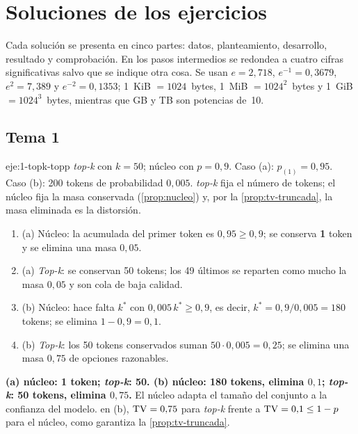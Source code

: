 \chapter{Soluciones de los ejercicios}
\label{ap:soluciones}

Cada solución se presenta en cinco partes: datos, planteamiento, desarrollo, resultado y comprobación. En los pasos intermedios se redondea a cuatro cifras significativas salvo que se indique otra cosa. Se usan $e=2{,}718$, $e^{-1}=0{,}3679$, $e^{2}=7{,}389$ y $e^{-2}=0{,}1353$; 1~KiB $=1024$~bytes, 1~MiB $=1024^{2}$~bytes y 1~GiB $=1024^{3}$~bytes, mientras que GB y TB son potencias de~10.

\section{Tema 1}

\begin{solucion}{eje:1-topk-topp}
\datos \emph{top-k} con $k=50$; núcleo con $p=0{,}9$. Caso (a): $p_{(1)}=0{,}95$. Caso (b): 200 tokens de probabilidad $0{,}005$.
\planteamiento \emph{top-k} fija el número de tokens; el núcleo fija la masa conservada (\cref{prop:nucleo}) y, por la \cref{prop:tv-truncada}, la masa eliminada es la distorsión.
\pasos
\begin{enumerate}[label=\arabic*.]
  \item (a) Núcleo: la acumulada del primer token es $0{,}95\ge 0{,}9$; se conserva \textbf{1} token y se elimina una masa $0{,}05$.
  \item (a) \emph{Top-k}: se conservan 50 tokens; los 49 últimos se reparten como mucho la masa $0{,}05$ y son cola de baja calidad.
  \item (b) Núcleo: hace falta $k^{\ast}$ con $0{,}005\,k^{\ast}\ge 0{,}9$, es decir, $k^{\ast}=0{,}9/0{,}005=180$ tokens; se elimina $1-0{,}9=0{,}1$.
  \item (b) \emph{Top-k}: los 50 tokens conservados suman $50\cdot 0{,}005=0{,}25$; se elimina una masa $0{,}75$ de opciones razonables.
\end{enumerate}
\resultado \textbf{(a) núcleo: 1 token; \emph{top-k}: 50. (b) núcleo: 180 tokens, elimina $0{,}1$; \emph{top-k}: 50 tokens, elimina $0{,}75$.} El núcleo adapta el tamaño del conjunto a la confianza del modelo.
\comprobacion en (b), $\operatorname{TV}=0{,}75$ para \emph{top-k} frente a $\operatorname{TV}=0{,}1\le 1-p$ para el núcleo, como garantiza la \cref{prop:tv-truncada}.
\end{solucion}

